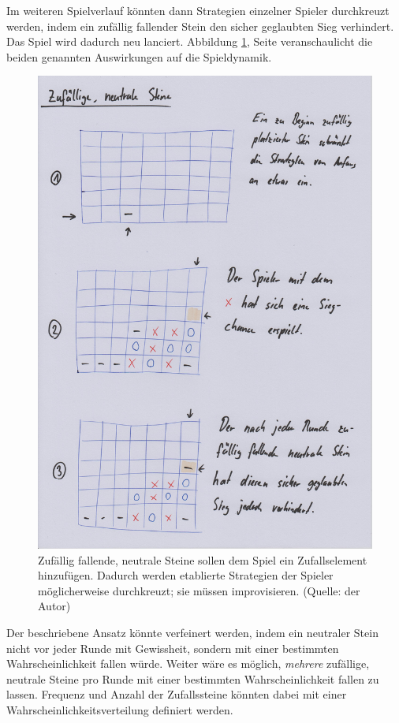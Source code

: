 \documentclass[a4paper,11pt,hidelinks]{scrartcl}
\newcommand{\imgref}[1]{{Abbildung \ref{#1}, Seite \pageref{#1}}}
\begin{document}
Im weiteren Spielverlauf könnten dann Strategien einzelner Spieler durchkreuzt werden, indem ein zufällig fallender Stein den sicher geglaubten Sieg verhindert. Das Spiel wird dadurch neu lanciert. \imgref{fig:neutral} veranschaulicht die beiden genannten Auswirkungen auf die Spieldynamik.

\begin{figure}
    \centering
    \includegraphics[width=0.9\linewidth]{pics/neutral-papier.jpg}
    \caption{Zufällig fallende, neutrale Steine sollen dem Spiel ein Zufallselement hinzufügen. Dadurch werden etablierte Strategien der Spieler möglicherweise durchkreuzt; sie müssen improvisieren. (Quelle: der Autor)}
    \label{fig:neutral}
\end{figure}

Der beschriebene Ansatz könnte verfeinert werden, indem ein neutraler Stein nicht vor jeder Runde mit Gewissheit, sondern mit einer bestimmten Wahrscheinlichkeit fallen würde. Weiter wäre es möglich, \textit{mehrere} zufällige, neutrale Steine pro Runde mit einer bestimmten Wahrscheinlichkeit fallen zu lassen. Frequenz und Anzahl der Zufallssteine könnten dabei mit einer Wahrscheinlichkeitsverteilung definiert werden.
\end{document}
